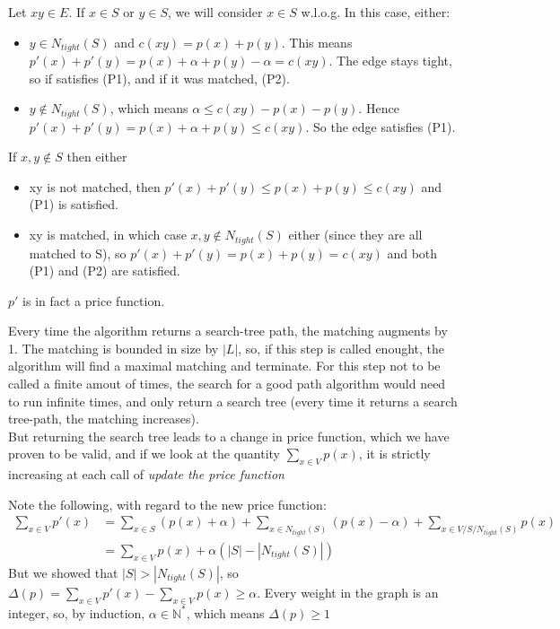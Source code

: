\documentclass{scrartcl}
\begin{document}
Let \( xy \in E \).
If \(x \in S\) or \(y \in S\), we will consider \( x \in S \) w.l.o.g. In this case, either:
\begin{itemize}
	\item \( y \in N_{tight}(S) \) and \( c(xy) = p(x) + p(y) \). This means \( p'(x) + p'(y) = p(x) + \alpha + p(y) - \alpha = c(xy) \). The edge stays tight, so if satisfies (P1), and if it was matched, (P2).
	\item \( y \not \in N_{tight}(S) \), which means \( \alpha \leq c(xy) - p(x) - p(y) \). Hence \( p'(x) + p'(y) = p(x) + \alpha + p(y) \leq c(xy) \). So the edge satisfies (P1).
\end{itemize}

If \( x,y \not \in S\) then either
\begin{itemize}
	\item xy is not matched, then \( p'(x) + p'(y) \leq p(x) + p(y) \leq c(xy) \) and (P1) is satisfied.
	\item xy is matched, in which case \( x,y \not \in N_{tight}(S) \) either (since they are all matched to S), so \( p'(x) + p'(y) = p(x) + p(y) = c(xy) \) and both (P1) and (P2) are satisfied.

\end{itemize}

\( p' \) is in fact a price function.


Every time the algorithm returns a search-tree path, the matching augments by 1. The matching is bounded in size by \( |L| \), so, if this step is called enought, the algorithm will find a maximal matching and terminate. For this step not to be called a finite amout of times, the search for a good path algorithm would need to run infinite times, and only return a search tree (every time it returns a search tree-path, the matching increases). \\

But returning the search tree leads to a change in price function, which we have proven to be valid, and if we look at the quantity \( \sum_{x \in V}p(x) \), it is strictly increasing at each call of \emph{update the price function}

Note the following, with regard to the new price function:
\begin{align*}
	\sum_{x \in V}p'(x) &= \sum_{x \in S}(p(x) + \alpha) + \sum_{x \in N_{tight}(S)}(p(x) - \alpha) + \sum_{x \in V / S / N_{tight}(S)}p(x)   \\ &= \sum_{x \in V}p(x) + \alpha( |S| - |N_{tight}(S)|) 
\end{align*}
		But we showed that \( |S| > |N_{tight}(S)| \), so \( \Delta(p) = \sum_{x \in V}p'(x) - \sum_{x \in V}p(x) \geq \alpha \). Every weight in the graph is an integer, so, by induction, \( \alpha \in \mathbb{N}^* \), which means \( \Delta(p) \geq 1 \)
\end{document}
